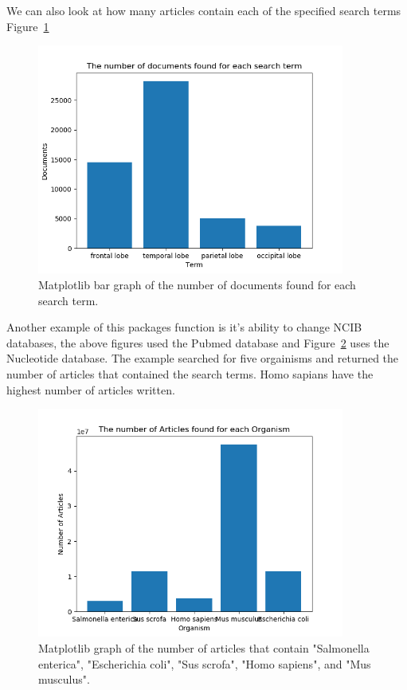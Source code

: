 \documentclass[12pt, letterpaper]{article}
\begin{document}
We can also look at how many articles contain each of the specified search terms Figure~\ref{fig:document}
%
\begin{figure}
  \centering
  \includegraphics[width=0.9\textwidth]{document}
  \caption{Matplotlib bar graph of the number of documents found for each search term.}
  \label{fig:document}
\end{figure}
%
Another example of this packages function is it's ability to change NCIB databases, the above figures used the Pubmed database and Figure~\ref{fig:organism} uses the Nucleotide database. The example searched for five orgainisms and returned the number of articles that contained the search terms. Homo sapians have the highest number of articles written.
%
\begin{figure}
  \centering
  \includegraphics[width=0.9\textwidth]{organism}
  \caption{Matplotlib graph of the number of articles that contain "Salmonella enterica", "Escherichia coli", "Sus scrofa", "Homo sapiens", and "Mus musculus".}
  \label{fig:organism}
\end{figure}
%
\end{document}
